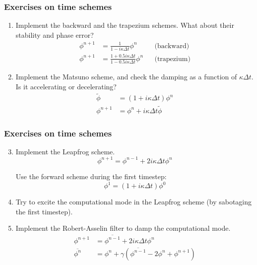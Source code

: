 \documentclass[aspectratio=43,9pt]{beamer}
\begin{document}
\begin{frame}
	\frametitle{Exercises on time schemes}
	\begin{enumerate}	
		\item Implement the backward and the trapezium schemes. What about their stability and phase error?
			\begin{align*}
				\phi^{n+1}&=\frac{1}{1-i\kappa\Delta t}\phi^n&&\text{(backward)}	\\
				\phi^{n+1}&=\frac{1+0.5i\kappa\Delta t}{1-0.5i\kappa\Delta t}\phi^n&&\text{(trapezium)}
			\end{align*}\vspace*{2ex}
		\item Implement the Matsuno scheme, and check the damping as a function of $\kappa\Delta t$. Is it accelerating or decelerating?
			\begin{align*}
				\tilde\phi&=(1+i\kappa\Delta t)\phi^{n}\\
				\phi^{n+1}&=\phi^n+i\kappa\Delta t\tilde\phi
			\end{align*}
	\end{enumerate}
\end{frame}
%
%
\begin{frame}
	\frametitle{Exercises on time schemes}
	\begin{enumerate}\setcounter{enumi}{2}
		\item Implement the Leapfrog scheme.
			\begin{equation*}
				\phi^{n+1}=\phi^{n-1}+2i\kappa\Delta t\phi^{n}
			\end{equation*}
			\par
			Use the forward scheme during the first timestep:
			\begin{equation*}
				\phi^{1}=(1+i\kappa\Delta t)\phi^{0}
			\end{equation*}\vspace*{2ex}
		\item Try to excite the computational mode in the Leapfrog scheme (by sabotaging the first timestep).\vspace*{2ex}
		\item Implement the Robert-Asselin filter to damp the computational mode.
			\begin{align*}
				\phi^{n+1}&=\overline{\phi^{n-1}}+2i\kappa\Delta t\phi^{n}\\
				\overline{\phi^n}&=\phi^n+\gamma\left(\overline{\phi^{n-1}}-2\phi^n+\phi^{n+1}\right)
			\end{align*}
	\end{enumerate}
\end{frame}
%
%
\end{document}
